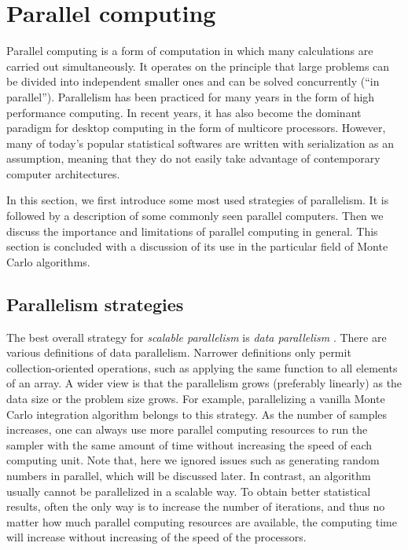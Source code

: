 \section{Parallel computing}
\label{sec:Parallel computing}

Parallel computing is a form of computation in which many calculations are
carried out simultaneously. It operates on the principle that large problems
can be divided into independent smaller ones and can be solved concurrently
(``in parallel''). Parallelism has been practiced for many years in the form
of high performance computing. In recent years, it has also become the
dominant paradigm for desktop computing in the form of multicore processors.
However, many of today's popular statistical softwares are written with
serialization as an assumption, meaning that they do not easily take advantage
of contemporary computer architectures.

In this section, we first introduce some most used strategies of parallelism.
It is followed by a description of some commonly seen parallel computers.
Then we discuss the importance and limitations of parallel computing in
general. This section is concluded with a discussion of its use in the
particular field of Monte Carlo algorithms.

\subsection{Parallelism strategies}
\label{sub:Parallelism strategies}

The best overall strategy for \emph{scalable parallelism} is \emph{data
  parallelism} \cite{datapar}. There are various definitions of data
parallelism. Narrower definitions only permit collection-oriented operations,
such as applying the same function to all elements of an array. A wider view
is that the parallelism grows (preferably linearly) as the data size or the
problem size grows. For example, parallelizing a vanilla Monte Carlo
integration algorithm belongs to this strategy. As the number of samples
increases, one can always use more parallel computing resources to run the
sampler with the same amount of time without increasing the speed of each
computing unit. Note that, here we ignored issues such as generating random
numbers in parallel, which will be discussed later. In contrast, an \mcmc
algorithm usually cannot be parallelized in a scalable way. To obtain better
statistical results, often the only way is to increase the number of
iterations, and thus no matter how much parallel computing resources are
available, the computing time will increase without increasing of the speed of
the processors.

